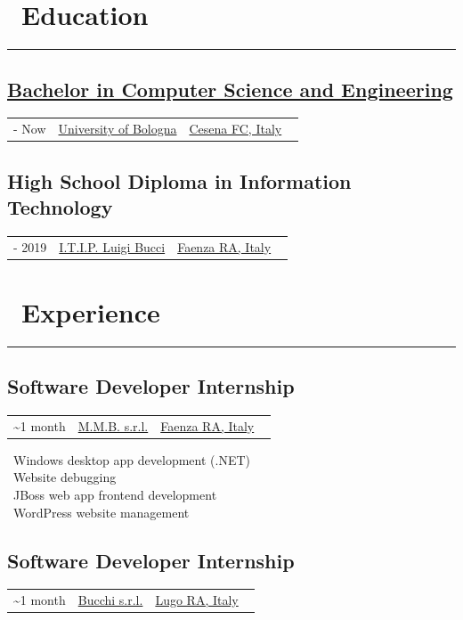 \documentclass{article}
\newcommand{\event}[3]{
    \begin{tabularx}{\linewidth}{| >{\raggedright\arraybackslash}X >{\centering\arraybackslash}X >{\raggedleft\arraybackslash}X}
        \rowcolor[HTML]{F6F8FA} #1 & #2 & #3
    \end{tabularx}
    \vspace{-10pt}
}
\let\oldsection\section
\renewcommand{\section}[1]{
    \oldsection*{#1}
    \vspace{-20pt}
    \rule{\linewidth}{2pt}
    \vspace{-30pt}
}
\let\oldsubsection\subsection
\renewcommand{\subsection}[1]{
    \oldsubsection*{#1}
    \vspace{-5pt}
}
\begin{document}
\setlength{\columnsep}{70pt}
\begin{paracol}{2}
    \section{\faGraduationCap \ Education}

    \subsection{\href{https://corsi.unibo.it/1cycle/ComputerScienceEngineering}{Bachelor in Computer Science and Engineering}}
    \event
        {\faCalendar* 2019 - Now}
        {\href{https://www.unibo.it/en/}{University of Bologna}}
        {\href{https://www.openstreetmap.org/relation/42809}{Cesena FC, Italy} \ \faCity}

    \subsection{High School Diploma in Information Technology}
    \event
        {\faCalendar* 2014 - 2019}
        {\href{https://www.itipfaenza.edu.it/}{I.T.I.P. Luigi Bucci}}
        {\href{https://www.openstreetmap.org/relation/43004}{Faenza RA, Italy} \ \faCity}


    \section{\faBriefcase \ Experience}

    \subsection{Software Developer Internship}
    \event
        {\faCalendar* 2018 \textasciitilde 1 month}
        {\href{https://www.mmbsoftware.it/portalemmb/en/home}{M.M.B. s.r.l.}}
        {\href{https://www.openstreetmap.org/relation/43004}{Faenza RA, Italy} \ \faCity}
    
    \noindent
    \faDesktop \ Windows desktop app development (.NET) \\
    \faBug \ Website debugging \\
    \faCoffee \ JBoss web app frontend development \\
    \faWordpress \ WordPress website management

    \subsection{Software Developer Internship}
    \event
        {\faCalendar* 2018 \textasciitilde 1 month}
        {\href{http://www.bucchi.it/en/}{Bucchi s.r.l.}}
        {\href{https://www.openstreetmap.org/relation/43140}{Lugo RA, Italy} \ \faCity}


\end{paracol}
\end{document}
